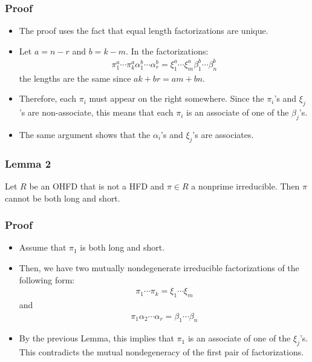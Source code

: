 \begin{frame}
  \frametitle{Proof}
  \begin{itemize}
    \item <1->The proof uses the fact that equal length factorizations are unique.
    \item <2->Let $a = n-r$ and $b = k - m$. In the factorizations:
      \begin{align*}
	\pi_1^a\cdots\pi_k^a\alpha_1^b\cdots\alpha_r^b=\xi_1^a\cdots\xi_m^a\beta_1^b\cdots\beta_n^b
      \end{align*}
      the lengths are the same since $ak+br=am+bn$. 
    \item <3->
      Therefore, each $\pi_i$ must appear on the right somewhere.
      Since the $\pi_i$'s and $\xi_j$'s are non-associate, this means that each $\pi_i$ is an associate of one of the $\beta_j$'s. 
    \item<4->The same argument shows that the $\alpha_i$'s and $\xi_j$'s are associates. 
  \end{itemize}
\end{frame}

\begin{frame}
  \frametitle{Lemma 2}
  \begin{lemma}
    Let $R$ be an OHFD that is not a HFD and $\pi \in R$ a nonprime irreducible. Then $\pi$ cannot be both long and short.
  \end{lemma}
\end{frame}

\begin{frame}
  \frametitle{Proof}
  \begin{itemize}
    \item <1->Assume that $\pi_1$ is both long and short.
    \item <2->Then, we have two mutually nondegenerate irreducible factorizations of the following form:
      \begin{align*}
	\pi_1\cdots\pi_k=\xi_1\cdots\xi_m
      \end{align*}
      and
      \begin{align*}
	\pi_1\alpha_2\cdots\alpha_r=\beta_1\cdots\beta_n
      \end{align*}
    \item <3->By the previous Lemma, this implies that $\pi_1$ is an associate of one of the $\xi_j$'s.
      This contradicts the mutual nondegeneracy of the first pair of factorizations.
  \end{itemize}
\end{frame}

